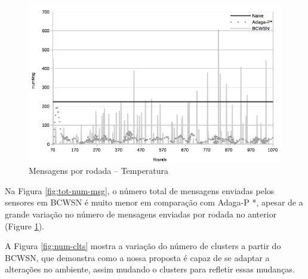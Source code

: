 \documentclass{acm_proc_article-sp}
\begin{document}
\begin{figure}[!htb]
\begin{center}
	\includegraphics[scale=0.28]{BCWSN-NumMsgPerRoundxRound-PB-Temp.png}
	 \vspace*{-.6cm}
	 \caption{Mensagens por rodada – Temperatura} 
    \label{fig:num-msg}
\end{center}
\end{figure}
\vspace*{-.6cm}


Na Figura \ref{fig:tot-num-msg}, o número total de mensagens enviadas pelos
sensores em BCWSN é muito menor em comparação com Adaga-P *,
{ apesar de a grande variação no número de mensagens enviadas por rodada no
anterior (Figure \ref{fig:num-msg}).} 
\vspace*{-.3cm}

A Figura \ref{fig:num-clts} mostra a variação do número de clusters
a partir do BCWSN, que demonstra como a nossa proposta é capaz de se
adaptar a alterações no ambiente, assim mudando o clusters para refletir
essas mudanças.
\vspace*{-.3cm}
\end{document}
